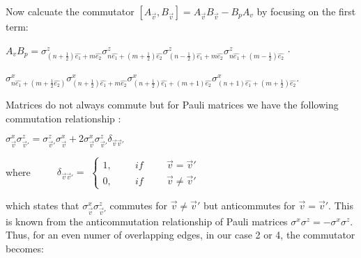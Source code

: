 \documentclass{Configuration_Files/PoliMi3i_thesis}
\begin{document}

Now calcuate the commutator $[A_{\vec{v}},B_{\vec{v}}] = A_{\vec{v}}B_{\vec{v}} - B_{p}A_{v}$ by focusing on the first term: \newline

\begin{center}
	
	$ A_{v}B_{p} =
	\sigma^z_{(n+\frac{1}{2})\hat{e_1} + m\hat{e_2}} \sigma^z_{n\hat{e_1}+(m+\frac{1}{2})\hat{e_2}} \sigma^z_{(n-\frac{1}{2})\hat{e_1} + m\hat{e_2}} \sigma^z_{n\hat{e_1}+(m-\frac{1}{2})\hat{e_2}} $ $\cdot$
	
	$\sigma^x_{n\hat{e_1} + (m+\frac{1}{2}\hat{e_2})} \sigma^x_{(n+ \frac{1}{2})\hat{e_1} + m\hat{e_2}} \sigma^x_{(n+ \frac{1}{2})\hat{e_1} + (m + 1)\hat{e_2}} \sigma^x_{(n+ 1)\hat{e_1} + (m + \frac{1}{2})\hat{e_2}}$. \newline
	
\end{center}


Matrices do not always commute but for Pauli matrices we have the following commutation relationship :
\newline

\begin{center}
	$\sigma^x_{\vec{v}}\sigma^z_{\vec{v}'} = \sigma^z_{\vec{v}'} \sigma^x_{\vec{v}} + 2 \sigma^x_{\vec{v}}\sigma^z_{\vec{v}'} \delta_{\vec{v} \vec{v}'}$\newline
\end{center}

where $\hspace{1cm} \delta_{\vec{v} \vec{v}'} =$
$\begin{cases}
	1, \hspace{1cm} if \hspace{1cm}  \vec{v} = \vec{v}'\\
	0, \hspace{1cm} if \hspace{1cm} \vec{v} \neq \vec{v}'
\end{cases}$\newline

which states that 	$\sigma^x_{\vec{v}}\sigma^z_{\vec{v}'}$ commutes for $\vec{v} \neq \vec{v}'$   but anticommutes for $\vec{v} = \vec{v}'$. This is known from the anticommutation relationship of Pauli matrices $\sigma^x \sigma^z = - \sigma^x \sigma^z$. Thus, for an even numer of overlapping edges, in our case 2 or 4, the commutator becomes:\newline
\end{document}
